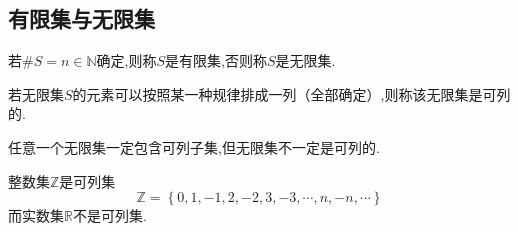 \subsection{有限集与无限集}
\begin{formal}
\begin{definition}[有限集与无限集]\label{def:有限集与无限集}
    若$\#S=n\in \mathbb{N}$确定,则称$S$是有限集,否则称$S$是无限集.
\end{definition}
\end{formal}
\begin{formal}
\begin{definition}[无限集的可列与不可列]\label{def:无限集的可列与不可列}
    若无限集$S$的元素可以按照某一种规律排成一列（全部确定）,则称该无限集是可列的.
\end{definition}
\end{formal}
\begin{formal}
\begin{theorem}[无限集与可列集]\label{thm:无限集与可列集}
    任意一个无限集一定包含可列子集,但无限集不一定是可列的.
\end{theorem}
\end{formal}
\begin{brown}
    \begin{example}
        整数集$\mathbb{Z}$是可列集\[
        \mathbb{Z}=\left\{
            0,1,-1,2,-2,3,-3,\cdots,n,-n,\cdots
        \right\}
        \]而实数集$\mathbb{R}$不是可列集.
    \end{example}
\end{brown}

